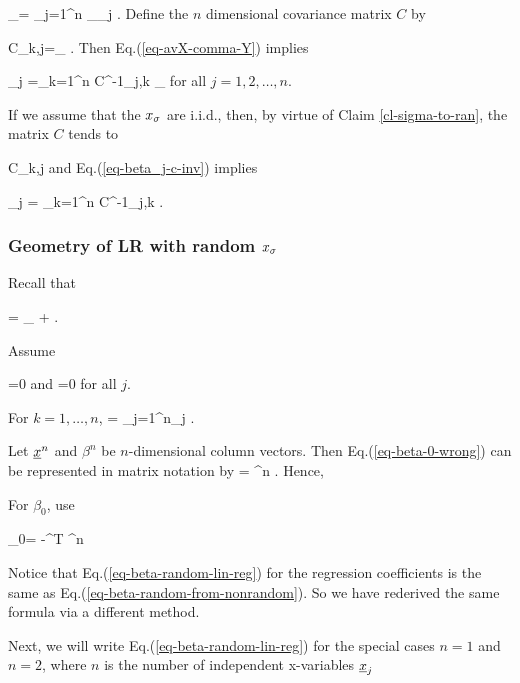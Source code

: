 \beq
{}_\s=
\sum_{j=1}^n 
_\s \beta_j
\label{eq-avX-comma-Y} 
\;.
\eeq
Define the $n$ dimensional 
covariance matrix $C$
by
 
\beq
C_{k,j}=_\s
\:.
\eeq
Then Eq.(\ref{eq-avX-comma-Y}) implies

\beq
\beta_j =\sum_{k=1}^n
C^{-1}_{j,k} _\s
\label{eq-beta_j-c-inv}
\eeq
for all $j=1,2,\ldots, n$.

If we assume that the $x_\sigma$ are i.i.d.,
then, by  virtue of Claim \ref{cl-sigma-to-ran},
the matrix $C$ tends to 


\beq
C_{k,j}
\rarrow {}
\eeq
and Eq.(\ref{eq-beta_j-c-inv})
implies 
 
\beq
\beta_j = \sum_{k=1}^n C^{-1}_{j,k}
\label{eq-beta-random-from-nonrandom}
\;.
\eeq

\subsubsection{Geometry of LR with random $x_\sigma$}
Recall that

\beq
\rvy = 
_{\hat{\rvy}}
+\ul{\eps}
\;.
\eeq


Assume 

\beq
\av{\rveps}=0
\eeq
and
\beq
{}=0
\eeq
for all $j$.

For $k=1, \ldots, n$,
\beq
{}
=
\sum_{j=1}^{n}\beta_j
\;.
\label{eq-beta-0-wrong}
\eeq

Let ${\underline{x}}^n$ and $\beta^n$ be
$n$-dimensional column vectors.
Then Eq.(\ref{eq-beta-0-wrong})
can be represented
 in matrix notation by
\beq
{}=
\beta^n
\;.
\eeq
Hence, 

\beq
{}
\label{eq-beta-random-lin-reg}
\eeq
For $\beta_0$, use

\beq
\beta_0=
\av{\rvy}-^T \beta^n
\eeq

Notice that 
Eq.(\ref{eq-beta-random-lin-reg})
for the regression coefficients
is the same
as Eq.(\ref{eq-beta-random-from-nonrandom}).
So we have rederived the same formula
via a different method.


Next, we will
write 
 Eq.(\ref{eq-beta-random-lin-reg})
for the special cases
$n=1$ and $n=2$,
where $n$ is the 
number of independent x-variables ${\underline{x}}_j$

